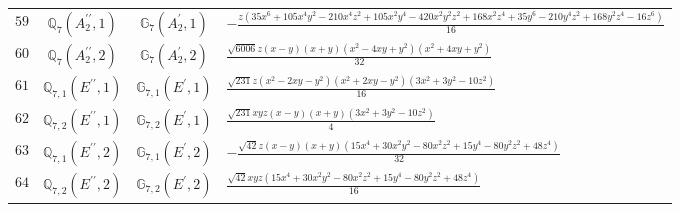 \documentclass[fleqn,8pt,landscape]{jsarticle}
\begin{document}
\begin{table}[ht!]
\begin{center}
\begin{tabular}{cccl}
$ 59 $ & $ \mathbb{Q}_{7}(A_{2}^{\prime\prime},1) $ & $ \mathbb{G}_{7}(A_{2}^{\prime},1) $ & $ - \frac{z \left(35 x^{6} + 105 x^{4} y^{2} - 210 x^{4} z^{2} + 105 x^{2} y^{4} - 420 x^{2} y^{2} z^{2} + 168 x^{2} z^{4} + 35 y^{6} - 210 y^{4} z^{2} + 168 y^{2} z^{4} - 16 z^{6}\right)}{16} $ \\
$ 60 $ & $ \mathbb{Q}_{7}(A_{2}^{\prime\prime},2) $ & $ \mathbb{G}_{7}(A_{2}^{\prime},2) $ & $ \frac{\sqrt{6006} z \left(x - y\right) \left(x + y\right) \left(x^{2} - 4 x y + y^{2}\right) \left(x^{2} + 4 x y + y^{2}\right)}{32} $ \\
$ 61 $ & $ \mathbb{Q}_{7,1}(E^{\prime\prime},1) $ & $ \mathbb{G}_{7,1}(E^{\prime},1) $ & $ \frac{\sqrt{231} z \left(x^{2} - 2 x y - y^{2}\right) \left(x^{2} + 2 x y - y^{2}\right) \left(3 x^{2} + 3 y^{2} - 10 z^{2}\right)}{16} $ \\
$ 62 $ & $ \mathbb{Q}_{7,2}(E^{\prime\prime},1) $ & $ \mathbb{G}_{7,2}(E^{\prime},1) $ & $ \frac{\sqrt{231} x y z \left(x - y\right) \left(x + y\right) \left(3 x^{2} + 3 y^{2} - 10 z^{2}\right)}{4} $ \\
$ 63 $ & $ \mathbb{Q}_{7,1}(E^{\prime\prime},2) $ & $ \mathbb{G}_{7,1}(E^{\prime},2) $ & $ - \frac{\sqrt{42} z \left(x - y\right) \left(x + y\right) \left(15 x^{4} + 30 x^{2} y^{2} - 80 x^{2} z^{2} + 15 y^{4} - 80 y^{2} z^{2} + 48 z^{4}\right)}{32} $ \\
$ 64 $ & $ \mathbb{Q}_{7,2}(E^{\prime\prime},2) $ & $ \mathbb{G}_{7,2}(E^{\prime},2) $ & $ \frac{\sqrt{42} x y z \left(15 x^{4} + 30 x^{2} y^{2} - 80 x^{2} z^{2} + 15 y^{4} - 80 y^{2} z^{2} + 48 z^{4}\right)}{16} $ \\
 \hline \hline
\end{tabular}
\end{center}
\end{table}
\end{document}
